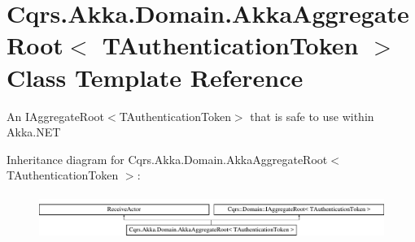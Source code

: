 \hypertarget{classCqrs_1_1Akka_1_1Domain_1_1AkkaAggregateRoot}{}\section{Cqrs.\+Akka.\+Domain.\+Akka\+Aggregate\+Root$<$ T\+Authentication\+Token $>$ Class Template Reference}
\label{classCqrs_1_1Akka_1_1Domain_1_1AkkaAggregateRoot}


An I\+Aggregate\+Root$<$\+T\+Authentication\+Token$>$ that is safe to use within Akka.\+N\+ET  


Inheritance diagram for Cqrs.\+Akka.\+Domain.\+Akka\+Aggregate\+Root$<$ T\+Authentication\+Token $>$\+:\begin{figure}[H]
\begin{center}
\leavevmode
\includegraphics[height=1.454545cm]{classCqrs_1_1Akka_1_1Domain_1_1AkkaAggregateRoot}
\end{center}
\end{figure}

